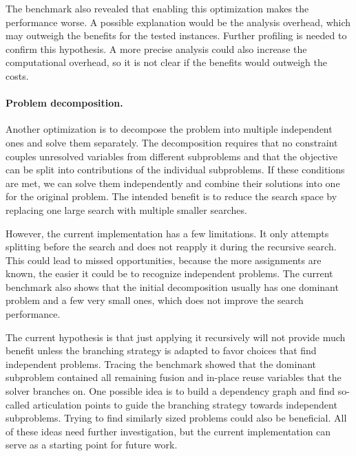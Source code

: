 The benchmark also revealed that enabling this optimization makes the performance worse.
A possible explanation would be the analysis overhead, which may outweigh the benefits for the tested instances.
Further profiling is needed to confirm this hypothesis.
A more precise analysis could also increase the computational overhead, so it is not clear if the benefits would outweigh the costs.

\paragraph{Problem decomposition.}

Another optimization is to decompose the problem into multiple independent ones and solve them separately.
The decomposition requires that no constraint couples unresolved variables from different subproblems and that the objective can be split into contributions of the individual subproblems.
If these conditions are met, we can solve them independently and combine their solutions into one for the original problem.
The intended benefit is to reduce the search space by replacing one large search with multiple smaller searches.

However, the current implementation has a few limitations.
It only attempts splitting before the search and does not reapply it during the recursive search.
This could lead to missed opportunities, because the more assignments are known, the easier it could be to recognize independent problems.
The current benchmark also shows that the initial decomposition usually has one dominant problem and a few very small ones, which does not improve the search performance.

The current hypothesis is that just applying it recursively will not provide much benefit unless the branching strategy is adapted to favor choices that find independent problems.
Tracing the benchmark showed that the dominant subproblem contained all remaining fusion and in-place reuse variables that the solver branches on.
One possible idea is to build a dependency graph and find so-called articulation points to guide the branching strategy towards independent subproblems.
Trying to find similarly sized problems could also be beneficial.
All of these ideas need further investigation, but the current implementation can serve as a starting point for future work.
